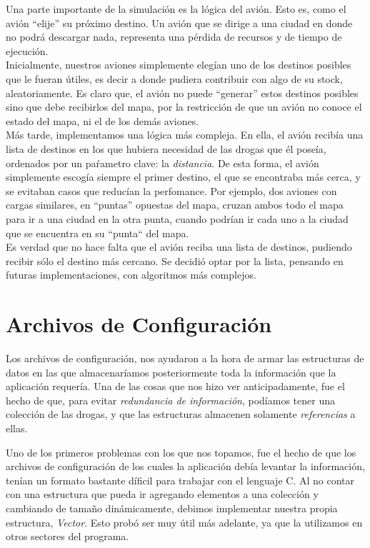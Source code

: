 \documentclass[a4paper,10pt]{article}
\begin{document}
Una parte importante de la simulación es la lógica del avión. Esto es, como el avión ``elije'' su próximo destino. Un avión que se dirige a una ciudad en donde no 
podrá descargar nada, representa una pérdida de recursos y de tiempo de ejecución.\\

Inicialmente, nuestros aviones simplemente elegían uno de los destinos posibles que le fueran útiles, es decir a donde pudiera contribuir con algo de su stock, 
aleatoriamente. Es claro que, el avión no puede ``generar'' estos destinos posibles sino que debe recibirlos del mapa, por la restricción de que un avión no 
conoce el estado del mapa, ni el de los demás aviones.\\

Más tarde, implementamos una lógica más compleja. En ella, el avión recibía una lista de destinos en los que hubiera necesidad de las drogas que él poseía, 
ordenados por un paŕametro clave: la \textit{distancia}. De esta forma, el avión simplemente escogía siempre el primer destino, el que se encontraba más cerca, y 
se evitaban casos que reducían la perfomance. Por ejemplo, dos aviones con cargas similares, en ``puntas'' opuestas del mapa, cruzan ambos todo el mapa para ir a una 
ciudad en la otra punta, cuando podrían ir cada uno a la ciudad que se encuentra en su ``punta`` del mapa.\\

Es verdad que no hace falta que el avión reciba una lista de destinos, pudiendo recibir sólo el destino más cercano. Se decidió optar por la lista, pensando en futuras
implementaciones, con algoritmos más complejos.

\newpage
\section{Archivos de Configuración}

Los archivos de configuración, nos ayudaron a la hora de armar las estructuras de datos en las que almacenaríamos posteriormente toda la información que la 
aplicación requería. Una de las cosas que nos hizo ver anticipadamente, fue el hecho de que, para evitar \textit{redundancia de información}, podíamos tener 
una colección de las drogas, y que las estructuras almacenen solamente \textit{referencias} a ellas. 

Uno de los primeros problemas con los que nos topamos, fue el hecho de que los archivos de configuración de los cuales la aplicación debía levantar la información,
 tenían un formato bastante díficil para trabajar con el lenguaje C. Al no contar con una estructura que pueda ir agregando elementos a una colección y cambiando 
de tamaño dinámicamente, debimos implementar nuestra propia estructura, \textit{Vector}. Esto probó ser muy útil más adelante, ya que la utilizamos en otros sectores 
del programa.\\
\end{document}

